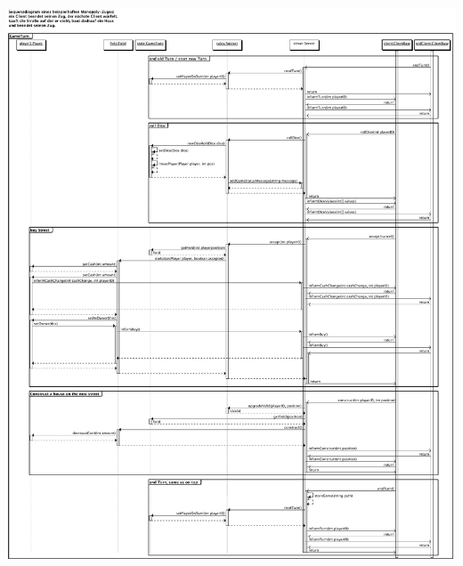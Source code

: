 \documentclass[a4paper,10pt]{article}
\begin{document}
\includegraphics[width=18cm]{Sequenzdiagramme/Spielzug}
\newpage
\end{document}
